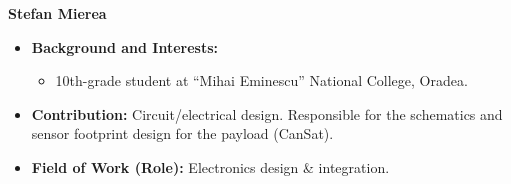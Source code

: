 \item[] \textbf{Stefan Mierea}
    \begin{itemize}[label=]
        \item[\faGraduationCap] \textbf{Background and Interests:} 
        \begin{itemize}[label=\textbullet]
            \item 10th-grade student at “Mihai Eminescu” National College, Oradea.
        \end{itemize}
        \item[\faEdit] \textbf{Contribution:} Circuit/electrical design. Responsible for the schematics and sensor footprint design for the payload (CanSat).
        \item[\faMicroscope] \textbf{Field of Work (Role):} Electronics design \& integration.
    \end{itemize}
    \vspace{0.2 cm}
    